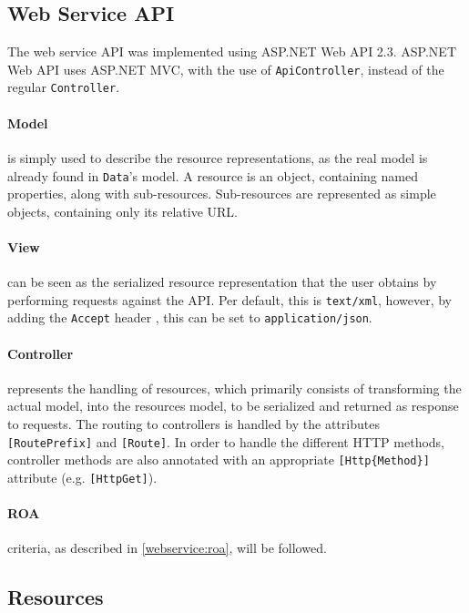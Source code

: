 \subsection{Web Service API}\label{design:web_service}
The web service API was implemented using ASP.NET Web API 2.3.\cite{aspnet_webapi}
ASP.NET Web API uses ASP.NET MVC\cite{aspnet_mvc}, with the use of \texttt{ApiController}, instead of the regular \texttt{Controller}.

\paragraph{Model} is simply used to describe the resource representations, as the real model is already found in \texttt{Data}'s model.
A resource is an object, containing named properties, along with sub-resources.
Sub-resources are represented as simple objects, containing only its relative URL.

\paragraph{View} can be seen as the serialized resource representation that the user obtains by performing requests against the API.
Per default, this is \texttt{text/xml}, however, by adding the \texttt{Accept} header , this can be set to \texttt{application/json}.

\paragraph{Controller} represents the handling of resources, which primarily consists of transforming the actual model, into the resources model, to be serialized and returned as response to requests.
The routing to controllers is handled by the attributes \texttt{[RoutePrefix]} and \texttt{[Route]}.
In order to handle the different HTTP methods, controller methods are also annotated with an appropriate \texttt{[Http\{Method\}]} attribute (e.g. \texttt{[HttpGet]}).

\paragraph{ROA} criteria, as described in \cref{webservice:roa}, will be followed.

\subsection{Resources}
\newcommand{\resource}[5]{\begin{description}
\item[URL:]{\texttt{#1}}
\item[Properties:]{\texttt{#2}}
\item[Resources:]{\texttt{#3}}
\item[Methods:]{\texttt{#4}}
\item[Responses:]{\texttt{#5}}
\end{description}}

